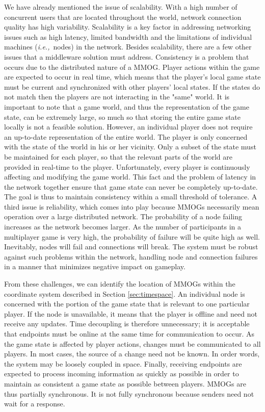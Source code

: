 \documentclass{acm_proc_article-sp}
\def\ie{{\it i.e.,\/}}
\begin{document}
We have already mentioned the issue of scalability.  With a high number of concurrent users that are located throughout the world, network connection quality has high variability.  Scalability is a key factor in addressing networking issues such as high latency, limited bandwidth and the limitations of individual machines (\ie\ nodes) in the network.  Besides scalability, there are a few other issues that a middleware solution must address.  Consistency is a problem that occurs due to the distributed nature of a MMOG.  Player actions within the game are expected to occur in real time, which means that the player's local game state must be current and synchronized with other players' local states.  If the states do not match then the players are not interacting in the "same" world.  It is important to note that a game world, and thus the representation of the game state, can be extremely large, so much so that storing the entire game state locally is not a feasible solution.  However, an individual player does not require an up-to-date representation of the entire world.  The player is only concerned with the state of the world in his or her vicinity.  Only a subset of the state must be maintained for each player, so that the relevant parts of the world are provided in real-time to the player.  Unfortunately, every player is continuously affecting and modifying the game world.  This fact and the problem of latency in the network together ensure that game state can never be completely up-to-date.  The goal is thus to maintain consistency within a small threshold of tolerance.  A third issue is reliability, which comes into play because MMOGs necessarily mean operation over a large distributed network.  The probability of a node failing increases as the network becomes larger.  As the number of participants in a multiplayer game is very high, the probability of failure will be quite high as well.  Inevitably, nodes will fail and connections will break.  The system must be robust against such problems within the network, handling node and connection failures in a manner that minimizes negative impact on gameplay.

From these challenges, we can identify the location of MMOGs within the coordinate system described in Section \ref{sec:timespace}.  An individual node is concerned with the portion of the game state that is relevant to one particular player.  If the node is unavailable, it means that the player is offline and need not receive any updates.  Time decoupling is therefore unnecessary; it is acceptable that endpoints must be online at the same time for communication to occur.  As the game state is affected by player actions, changes must be communicated to all players.  In most cases, the source of a change need not be known.  In order words, the system may be loosely coupled in space.  Finally, receiving endpoints are expected to process incoming information as quickly as possible in order to maintain as consistent a game state as possible between players.  MMOGs are thus partially synchronous.  It is not fully synchronous because senders need not wait for a response.
\end{document}
